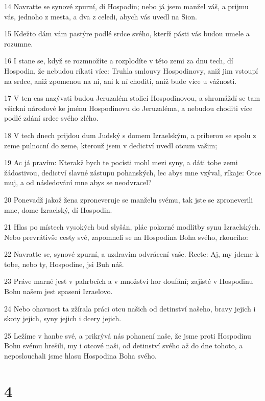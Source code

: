 \par 14 Navratte se synové zpurní, dí Hospodin; nebo já jsem manžel váš, a prijmu vás, jednoho z mesta, a dva z celedi, abych vás uvedl na Sion.
\par 15 Kdežto dám vám pastýre podlé srdce svého, kteríž pásti vás budou umele a rozumne.
\par 16 I stane se, když se rozmnožíte a rozplodíte v této zemi za dnu tech, dí Hospodin, že nebudou ríkati více: Truhla smlouvy Hospodinovy, aniž jim vstoupí na srdce, aniž zpomenou na ni, ani k ní choditi, aniž bude více u vážnosti.
\par 17 V ten cas nazývati budou Jeruzalém stolicí Hospodinovou, a shromáždí se tam všickni národové ke jménu Hospodinovu do Jeruzaléma, a nebudou choditi více podlé zdání srdce svého zlého.
\par 18 V tech dnech prijdou dum Judský s domem Izraelským, a priberou se spolu z zeme pulnocní do zeme, kterouž jsem v dedictví uvedl otcum vašim;
\par 19 Ac já pravím: Kterakž bych te pocísti mohl mezi syny, a dáti tobe zemi žádostivou, dedictví slavné zástupu pohanských, lec abys mne vzýval, ríkaje: Otce muj, a od následování mne abys se neodvracel?
\par 20 Ponevadž jakož žena zproneveruje se manželu svému, tak jste se zproneverili mne, dome Izraelský, dí Hospodin.
\par 21 Hlas po místech vysokých bud slyšán, plác pokorné modlitby synu Izraelských. Nebo prevrátivše cesty své, zapomneli se na Hospodina Boha svého, rkoucího:
\par 22 Navratte se, synové zpurní, a uzdravím odvrácení vaše. Rcete: Aj, my jdeme k tobe, nebo ty, Hospodine, jsi Buh náš.
\par 23 Práve marné jest v pahrbcích a v množství hor doufání; zajisté v Hospodinu Bohu našem jest spasení Izraelovo.
\par 24 Nebo ohavnost ta zžírala práci otcu našich od detinství našeho, bravy jejich i skoty jejich, syny jejich i dcery jejich.
\par 25 Ležíme v hanbe své, a prikrývá nás pohanení naše, že jsme proti Hospodinu Bohu svému hrešili, my i otcové naši, od detinství svého až do dne tohoto, a neposlouchali jsme hlasu Hospodina Boha svého.

\chapter{4}

